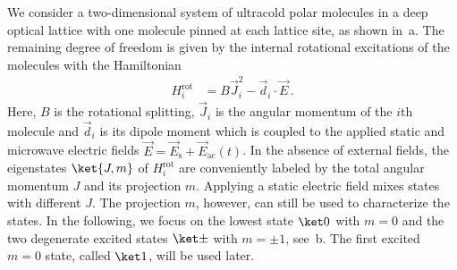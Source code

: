 We consider a two-dimensional system of ultracold polar molecules in a deep optical lattice with one molecule pinned at each lattice site, as shown in~a.
The remaining degree of freedom is given by the internal rotational excitations of the molecules with the Hamiltonian
\begin{align}
    H^{\text{rot}}_i &= B \vec{J}_i^2 - \vec{d}_i\cdot\vec{E}\,.
\end{align}
Here, $B$ is the rotational splitting, $\vec{J}_i$ is the angular momentum of the $i$th molecule and $\vec{d}_i$ is its dipole moment which is coupled to the applied static and microwave electric fields $\vec{E} = \vec{E}_{\text{s}} + \vec{E}_{\text{ac}}(t)$.
In the absence of external fields, the eigenstates $\ket{J,m}$ of $H^{\text{rot}}_{i}$ are conveniently labeled by the total angular momentum $J$ and its projection $m$.
Applying a static electric field mixes states with different $J$.
The projection $m$, however, can still be used to characterize the states.
In the following, we focus on the lowest state $\ketz$ with $m=0$ and the two degenerate excited states $\ketpm$ with $m = \pm 1$, see~b.
The first excited $m=0$ state, called $\keto$, will be used later.



